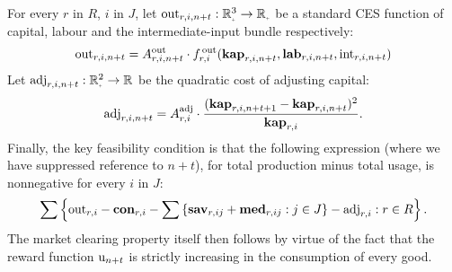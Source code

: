 \documentclass[12pt,a4paper,twoside, draft]{article}
\begin{document}
For every $r$ in $R$, $i$ in $J$, let
$\textup{out}_{r, i, n + t}: \nnreal^{3} \rightarrow \nnreal$ be a standard
CES function of capital, labour and the intermediate-input bundle respectively:
\begin{equation}
	\textup{out}_{r, i, n + t}
    = A_{r, i, n + t} ^ \textup{out} \cdot f_{r, i}
      ^ \textup{\,out}(
        \mathbf{kap}_{r, i, n + t},
        \mathbf{lab}_{r, i, n + t},
        \textup{int}_{r, i, n + t}
        )
\end{equation}
Let $\text{adj}_{r, i, n + t}: \nnreal^{2} \rightarrow \R$ be the quadratic
cost of adjusting capital:
\begin{equation}
  \textup{adj}_{r, i, n + t}
    = A_{r, i} ^ \textup{adj} 
      \cdot \frac{(\mathbf{kap}_{r, i, n + t + 1}
      - \mathbf{kap}_{r, i, n + t})^2}
        {\mathbf{kap}_{r, i}}.
\end{equation}
Finally, the key feasibility condition is that the following expression (where
we have suppressed reference to $n + t$), for total production minus total
usage, is nonnegative for every $i$ in $J$:
\begin{equation}
  \sum \left \{
  \textup{out}_{r, i}
  - \mathbf{con}_{r, i}
  - \sum\left \{ \mathbf{sav}_{r, ij} + \mathbf{med}_{r, ij} : j \in J \right\}
  - \textup{adj}_{r, i} : r \in R
\right\}.
\end{equation}
The market clearing property itself then follows by virtue of the fact that
the reward function $\textup{u}_{n + t}$ is strictly increasing in the
consumption of every good.
\end{document}
